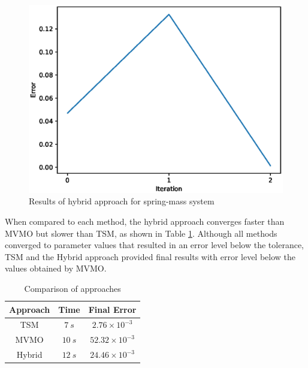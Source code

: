 \begin{figure}[h]
	\caption{Results of hybrid approach for spring-mass system}
	\begin{center}
		\includegraphics[scale=0.7]{Images/Hybrid_conv_.eps}
	\end{center}
	\label{fig: Hybrid_conv}
\end{figure}

When compared to each method, the hybrid approach converges faster than MVMO but slower than TSM, as shown in Table \ref{tab: SM}. Although all methods converged to parameter values that resulted in an error level below the tolerance, TSM and the Hybrid approach provided final results with error level below the values obtained by MVMO.

\begin{table}[h]
	\caption{Comparison of approaches}
	\begin{center}
	\begin{tabular}{c|c|c}
		Approach & Time & Final Error \\
		\hline
		TSM  & $7 \ s$  & $2.76\times 10^{-3}$ \\
		MVMO  & $10\ s$  & $52.32\times 10^{-3}$\\
		Hybrid  & $12\ s$  & $24.46\times 10^{-3}$
	\end{tabular}
	\end{center}
	\label{tab: SM}
\end{table}
